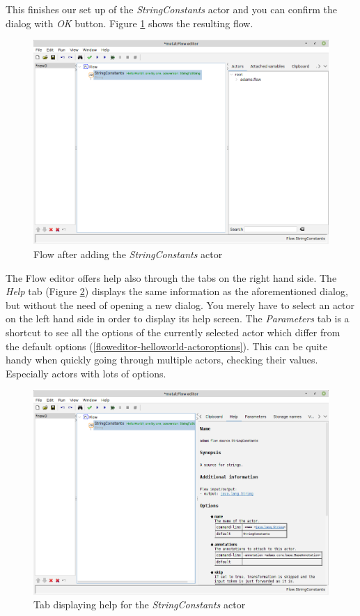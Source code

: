 This finishes our set up of the \textit{StringConstants} actor and you can
confirm the dialog with \textit{OK} button. Figure
\ref{floweditor-helloworld-addactor5} shows the resulting flow.

\begin{figure}[htb]
  \centering
  \includegraphics[width=12.0cm]{images/floweditor-helloworld-addactor5.png}
  \caption{Flow after adding the \textit{StringConstants} actor}
  \label{floweditor-helloworld-addactor5}
\end{figure}

The Flow editor offers help also through the tabs on the right hand side. The
\textit{Help} tab (Figure \ref{floweditor-helloworld-actorhelp-tab}) displays
the same information as the aforementioned dialog, but without the need of
opening a new dialog. You merely have to select an actor on the left hand side
in order to display its help screen. The \textit{Parameters} tab is a shortcut
to see all the options of the currently selected actor which differ from the
default options (\ref{floweditor-helloworld-actoroptions}). This can be quite
handy when quickly going through multiple actors, checking their values.
Especially actors with lots of options.

\begin{figure}[htb]
  \centering
  \includegraphics[width=12.0cm]{images/floweditor-helloworld-actorhelp-tab.png}
  \caption{Tab displaying help for the \textit{StringConstants} actor}
  \label{floweditor-helloworld-actorhelp-tab}
\end{figure}

